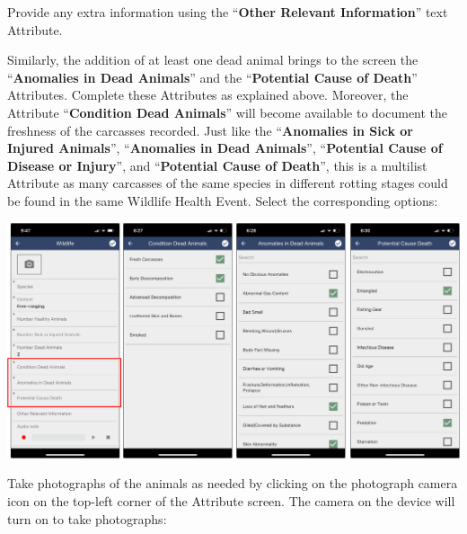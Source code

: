 \documentclass[
  letterpaper,
  DIV=11,
  numbers=noendperiod]{scrreprt}
\begin{document}
Provide any extra information using the ``\textbf{Other Relevant
Information}'' text Attribute.

Similarly, the addition of at least one dead animal brings to the screen
the ``\textbf{Anomalies in Dead Animals}'' and the ``\textbf{Potential
Cause of Death}'' Attributes. Complete these Attributes as explained
above. Moreover, the Attribute ``\textbf{Condition Dead Animals}'' will
become available to document the freshness of the carcasses recorded.
Just like the ``\textbf{Anomalies in Sick or Injured Animals}'',
``\textbf{Anomalies in Dead Animals}'', ``\textbf{Potential Cause of
Disease or Injury}'', and ``\textbf{Potential Cause of Death}'', this is
a multilist Attribute as many carcasses of the same species in different
rotting stages could be found in the same Wildlife Health Event. Select
the corresponding options:

\includegraphics[width=11.66667in,height=\textheight]{Pictures_for_manual/Picture13.png}

Take photographs of the animals as needed by clicking on the photograph
camera icon on the top-left corner of the Attribute screen. The camera
on the device will turn on to take photographs:
\end{document}

